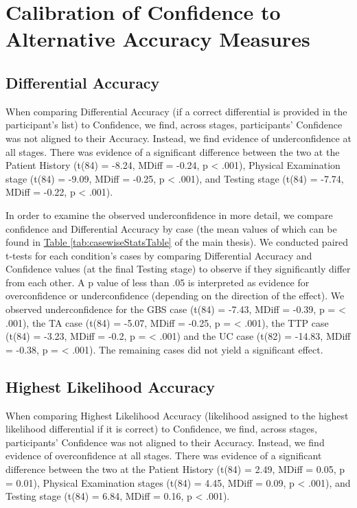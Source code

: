 \documentclass[a4paper, nobind]{templates/ociamthesis}
\begin{document}
\newpage

\section{Calibration of Confidence to Alternative Accuracy Measures}\label{calibrations}

\subsection{Differential Accuracy}\label{differential-accuracy}

When comparing Differential Accuracy (if a correct differential is provided in the participant's list) to Confidence, we find, across stages, participants' Confidence was not aligned to their Accuracy. Instead, we find evidence of underconfidence at all stages. There was evidence of a significant difference between the two at the Patient History (t(84) = -8.24, MDiff = -0.24, p \textless{} .001), Physical Examination stage (t(84) = -9.09, MDiff = -0.25, p \textless{} .001), and Testing stage (t(84) = -7.74, MDiff = -0.22, p \textless{} .001).

\hfill\break
In order to examine the observed underconfidence in more detail, we compare confidence and Differential Accuracy by case (the mean values of which can be found in \hyperref[tab:casewiseStatsTable]{Table \ref{tab:casewiseStatsTable}} of the main thesis). We conducted paired t-tests for each condition's cases by comparing Differential Accuracy and Confidence values (at the final Testing stage) to observe if they significantly differ from each other. A p value of less than .05 is interpreted as evidence for overconfidence or underconfidence (depending on the direction of the effect). We observed underconfidence for the GBS case (t(84) = -7.43, MDiff = -0.39, p = \textless{} .001), the TA case (t(84) = -5.07, MDiff = -0.25, p = \textless{} .001), the TTP case (t(84) = -3.23, MDiff = -0.2, p = \textless{} .001) and the UC case (t(82) = -14.83, MDiff = -0.38, p = \textless{} .001). The remaining cases did not yield a significant effect.

\subsection{Highest Likelihood Accuracy}\label{highest-likelihood-accuracy}

When comparing Highest Likelihood Accuracy (likelihood assigned to the highest likelihood differential if it is correct) to Confidence, we find, across stages, participants' Confidence was not aligned to their Accuracy. Instead, we find evidence of overconfidence at all stages. There was evidence of a significant difference between the two at the Patient History (t(84) = 2.49, MDiff = 0.05, p = 0.01), Physical Examination stages (t(84) = 4.45, MDiff = 0.09, p \textless{} .001), and Testing stage (t(84) = 6.84, MDiff = 0.16, p \textless{} .001).
\end{document}

